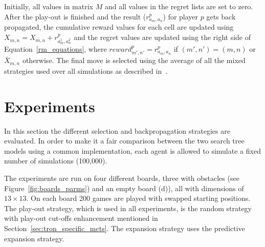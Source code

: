 \documentclass{article}
\begin{document}

Initially, all values in matrix $M$ and all values in the regret lists are set to zero. After the play-out is finished and the result ($r^{p}_{a_{m},a_{n}}$) for player $p$ gets back propagated, the cumulative reward values for each cell are updated using $X_{m,n} = X_{m,n} + r^{p}_{a^{1}_{m},a^{2}_{n}}$ and the regret values are updated using the right side of Equation~\ref{rm_equations},
where $reward^p_{m',n'} = r^p_{a_m,a_n}$ if $(m',n') = (m,n)$ or $\bar{X}_{m,n}$ otherwise.
The final move is selected using the average of all the mixed strategies used over all simulations as described in~\cite{mcts_goofspiel}. 




\section{Experiments}
\label{sec:experiments}

In this section the different selection and backpropagation strategies are evaluated. 
In order to make it a fair comparison between the two search tree models using a common implementation, each agent is allowed to simulate a fixed number of simulations (100,000).

The experiments are run on four different boards, three with obstacles (see Figure~\ref{fig:boards_parms}) and an empty board (d)), all with dimensions of $13 \times 13$. 
On each board 200 games are played with swapped starting positions. 
The play-out strategy, which is used in all experiments, is the random strategy with play-out cut-offs enhancement mentioned in Section~\ref{sec:tron_specific_mcts}. The expansion strategy uses the predictive expansion strategy.
\end{document}
